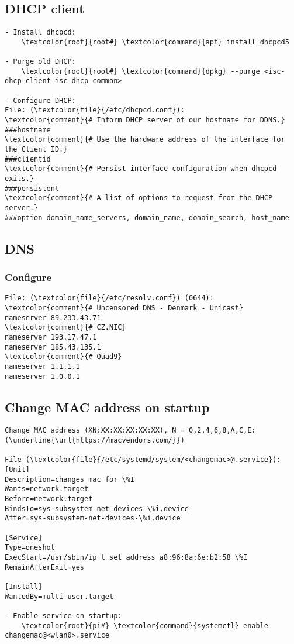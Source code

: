 \documentclass[10pt, a4paper, onecolumn, openany]{book} %
\begin{document}
\subsection{DHCP client}
\begin{Verbatim}[commandchars=\\\{\}]
- Install dhcpcd:
    \textcolor{root}{root#} \textcolor{command}{apt} install dhcpcd5

- Purge old DHCP:
    \textcolor{root}{root#} \textcolor{command}{dpkg} --purge <isc-dhcp-client isc-dhcp-common>
    
- Configure DHCP:
File: (\textcolor{file}{/etc/dhcpcd.conf}):
\textcolor{comment}{# Inform DHCP server of our hostname for DDNS.}
###hostname
\textcolor{comment}{# Use the hardware address of the interface for the Client ID.}
###clientid
\textcolor{comment}{# Persist interface configuration when dhcpcd exits.}
###persistent
\textcolor{comment}{# A list of options to request from the DHCP server.}
###option domain_name_servers, domain_name, domain_search, host_name
\end{Verbatim}
\subsection{DNS}
\subsubsection{Configure}
\begin{Verbatim}[commandchars=\\\{\}]
File: (\textcolor{file}{/etc/resolv.conf}) (0644):
\textcolor{comment}{# Uncensored DNS - Denmark - Unicast}
nameserver 89.233.43.71
\textcolor{comment}{# CZ.NIC}
nameserver 193.17.47.1
nameserver 185.43.135.1
\textcolor{comment}{# Quad9}
nameserver 1.1.1.1
nameserver 1.0.0.1
\end{Verbatim}

\subsection{Change MAC address on startup}
\begin{Verbatim}[commandchars=\\\{\}]
Change MAC address (XN:XX:XX:XX:XX:XX), N = 0,2,4,6,8,A,C,E:
(\underline{\url{https://macvendors.com/}})

File (\textcolor{file}{/etc/systemd/system/<changemac>@.service}):
[Unit]
Description=changes mac for \%I
Wants=network.target
Before=network.target
BindsTo=sys-subsystem-net-devices-\%i.device
After=sys-subsystem-net-devices-\%i.device

[Service]
Type=oneshot
ExecStart=/usr/sbin/ip l set address a8:96:8a:6e:b2:58 \%I
RemainAfterExit=yes

[Install]
WantedBy=multi-user.target

- Enable service on startup:
    \textcolor{root}{pi#} \textcolor{command}{systemctl} enable changemac@<wlan0>.service
\end{Verbatim}
\end{document}
